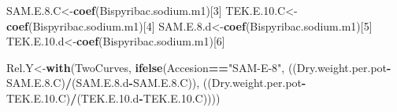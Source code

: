 \documentclass[letterpaper,]{book}
\newenvironment{Shaded}{\begin{snugshade}}{\end{snugshade}}
\newcommand{\DecValTok}[1]{\textcolor[rgb]{0.00,0.00,0.81}{#1}}
\newcommand{\FloatTok}[1]{\textcolor[rgb]{0.00,0.00,0.81}{#1}}
\newcommand{\KeywordTok}[1]{\textcolor[rgb]{0.13,0.29,0.53}{\textbf{#1}}}
\newcommand{\NormalTok}[1]{#1}
\newcommand{\OperatorTok}[1]{\textcolor[rgb]{0.81,0.36,0.00}{\textbf{#1}}}
\newcommand{\StringTok}[1]{\textcolor[rgb]{0.31,0.60,0.02}{#1}}
\begin{document}
\begin{Shaded}
\begin{Highlighting}[]
\NormalTok{SAM.E.}\FloatTok{8.}\NormalTok{C<-}\KeywordTok{coef}\NormalTok{(Bispyribac.sodium.m1)[}\DecValTok{3}\NormalTok{]}
\NormalTok{TEK.E.}\FloatTok{10.}\NormalTok{C<-}\KeywordTok{coef}\NormalTok{(Bispyribac.sodium.m1)[}\DecValTok{4}\NormalTok{]}
\NormalTok{SAM.E.}\FloatTok{8.}\NormalTok{d<-}\KeywordTok{coef}\NormalTok{(Bispyribac.sodium.m1)[}\DecValTok{5}\NormalTok{]}
\NormalTok{TEK.E.}\FloatTok{10.}\NormalTok{d<-}\KeywordTok{coef}\NormalTok{(Bispyribac.sodium.m1)[}\DecValTok{6}\NormalTok{]}

\NormalTok{Rel.Y<-}\KeywordTok{with}\NormalTok{(TwoCurves,}
            \KeywordTok{ifelse}\NormalTok{(Accesion}\OperatorTok{==}\StringTok{"SAM-E-8"}\NormalTok{, }
\NormalTok{                   ((Dry.weight.per.pot}\OperatorTok{-}\NormalTok{SAM.E.}\FloatTok{8.}\NormalTok{C)}\OperatorTok{/}\NormalTok{(SAM.E.}\FloatTok{8.}\NormalTok{d}\OperatorTok{-}\NormalTok{SAM.E.}\FloatTok{8.}\NormalTok{C)),}
\NormalTok{                   ((Dry.weight.per.pot}\OperatorTok{-}\NormalTok{TEK.E.}\FloatTok{10.}\NormalTok{C)}\OperatorTok{/}\NormalTok{(TEK.E.}\FloatTok{10.}\NormalTok{d}\OperatorTok{-}\NormalTok{TEK.E.}\FloatTok{10.}\NormalTok{C))))}


\end{Highlighting}
\end{Shaded}
\end{document}
